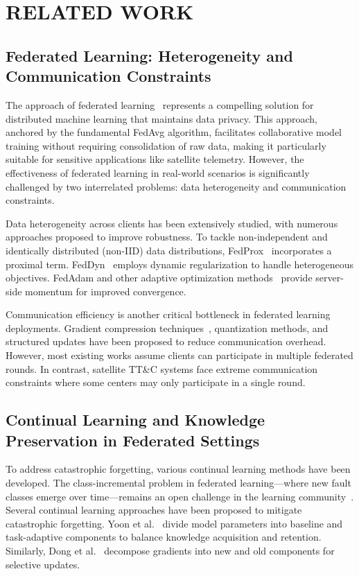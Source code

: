 \section{RELATED WORK}\label{sec:Related_Work}

\subsection{Federated Learning: Heterogeneity and Communication Constraints}

The approach of federated learning~\cite{mcmahan2017communication} represents a compelling solution for distributed machine learning that maintains data privacy. 
This approach, anchored by the fundamental FedAvg algorithm, facilitates collaborative model training without requiring consolidation of raw data, 
making it particularly suitable for sensitive applications like satellite telemetry. 
However, the effectiveness of federated learning in real-world scenarios is significantly challenged by two interrelated problems: data heterogeneity and communication constraints.

Data heterogeneity across clients has been extensively studied, with numerous approaches proposed to improve robustness. 
To tackle non-independent and identically distributed (non-IID) data distributions, FedProx~\cite{li2020federated} incorporates a proximal term. 
FedDyn~\cite{jin2023feddyn} employs dynamic regularization to handle heterogeneous objectives. 
FedAdam and other adaptive optimization methods~\cite{reddi2020adaptive} provide server-side momentum for improved convergence.

Communication efficiency is another critical bottleneck in federated learning deployments. 
Gradient compression techniques~\cite{lin2017deep}, quantization methods, and structured updates have been proposed to reduce communication overhead. 
However, most existing works assume clients can participate in multiple federated rounds. 
In contrast, satellite TT\&C systems face extreme communication constraints where some centers may only participate in a single round.

\subsection{Continual Learning and Knowledge Preservation in Federated Settings}

To address catastrophic forgetting, various continual learning methods have been developed. 
The class-incremental problem in federated learning—where new fault classes emerge over time—remains an open challenge in the learning community~\cite{de2021continual}. 
Several continual learning approaches have been proposed to mitigate catastrophic forgetting. 
Yoon et al.~\cite{yoon2021federated} divide model parameters into baseline and task-adaptive components to balance knowledge acquisition and retention. 
Similarly, Dong et al.~\cite{de2021continual} decompose gradients into new and old components for selective updates.

